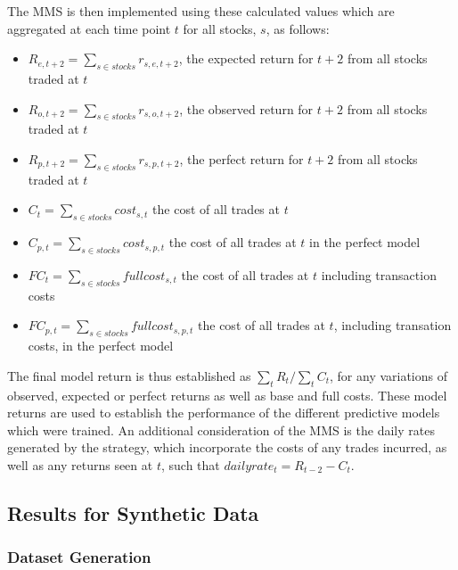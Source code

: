 \documentclass[a4paper,latin]{paper}
\begin{document}
\hfill\break
The MMS  is then implemented using these calculated values which are aggregated at each time point $t$ for all stocks, $s$, as follows:

\begin{itemize}
	\item $R_{e, {t+2}} = \sum_{s \in stocks} r_{s, e, {t+2}}$, the expected return for $t+2$ from all stocks traded at $t$
	\item $R_{o, {t+2}} = \sum_{s \in stocks} r_{s, o, {t+2}}$, the observed return for $t+2$ from all stocks traded at $t$
	\item $R_{p, {t+2}} = \sum_{s \in stocks} r_{s, p, {t+2}}$, the perfect return for $t+2$ from all stocks traded at $t$	
	\item $C_t = \sum_{s \in stocks} cost_{s,t}$ the cost of all trades at $t$
	\item $C_{p,t} = \sum_{s \in stocks} cost_{s, p ,t}$ the cost of all trades at $t$ in the perfect model
	\item $FC_t = \sum_{s \in stocks} fullcost_{s,t}$ the cost of all trades at $t$ including transaction costs
	\item $FC_{p,t} = \sum_{s \in stocks} fullcost_{s, p ,t}$ the cost of all trades at $t$, including transation costs, in the perfect model	
\end{itemize}
\hfill\break
The final model return is thus established as $\sum_t{R_t} / \sum_t{C_t} $, for any variations of observed, expected or perfect returns as well as base and full costs. These model returns are used to establish the performance of the different predictive models which were trained.\newline
\hfill\break
An additional consideration of the MMS is the daily rates generated by the strategy, which incorporate the costs of any trades incurred, as well as any returns seen at $t$, such that $dailyrate_t = R_{t-2} - C_t$.

\subsection{Results for Synthetic Data}

\subsubsection{Dataset Generation}
\end{document}
